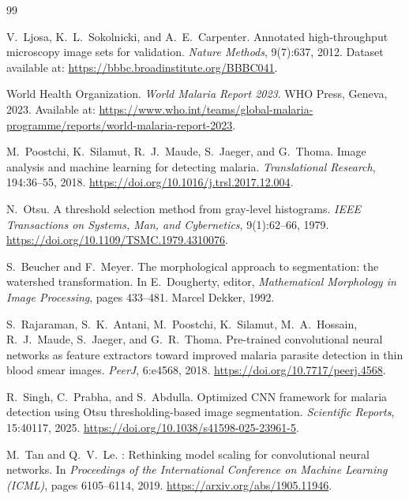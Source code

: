 \documentclass[10pt,twocolumn]{article}
\begin{document}
\begin{thebibliography}{99}

V.~Ljosa, K.~L.~Sokolnicki, and A.~E.~Carpenter.
\newblock Annotated high-throughput microscopy image sets for validation.
\newblock \textit{Nature Methods}, 9(7):637, 2012.
\newblock Dataset available at: \url{https://bbbc.broadinstitute.org/BBBC041}.

World Health Organization.
\newblock \textit{World Malaria Report 2023}.
\newblock WHO Press, Geneva, 2023.
\newblock Available at: \url{https://www.who.int/teams/global-malaria-programme/reports/world-malaria-report-2023}.

M.~Poostchi, K.~Silamut, R.~J.~Maude, S.~Jaeger, and G.~Thoma.
\newblock Image analysis and machine learning for detecting malaria.
\newblock \textit{Translational Research}, 194:36--55, 2018.
\newblock \url{https://doi.org/10.1016/j.trsl.2017.12.004}.

N.~Otsu.
\newblock A threshold selection method from gray-level histograms.
\newblock \textit{IEEE Transactions on Systems, Man, and Cybernetics},
  9(1):62--66, 1979.
\newblock \url{https://doi.org/10.1109/TSMC.1979.4310076}.

S.~Beucher and F.~Meyer.
\newblock The morphological approach to segmentation: the watershed
  transformation.
\newblock In E.~Dougherty, editor, \textit{Mathematical Morphology in Image
  Processing}, pages 433--481. Marcel Dekker, 1992.

S.~Rajaraman, S.~K.~Antani, M.~Poostchi, K.~Silamut, M.~A.~Hossain,
  R.~J.~Maude, S.~Jaeger, and G.~R.~Thoma.
\newblock Pre-trained convolutional neural networks as feature extractors
  toward improved malaria parasite detection in thin blood smear images.
\newblock \textit{PeerJ}, 6:e4568, 2018.
\newblock \url{https://doi.org/10.7717/peerj.4568}.

R.~Singh, C.~Prabha, and S.~Abdulla.
\newblock Optimized {CNN} framework for malaria detection using
  {Otsu} thresholding-based image segmentation.
\newblock \textit{Scientific Reports}, 15:40117, 2025.
\newblock \url{https://doi.org/10.1038/s41598-025-23961-5}.

M.~Tan and Q.~V.~Le.
: Rethinking model scaling for convolutional neural
  networks.
\newblock In \textit{Proceedings of the International Conference on Machine
  Learning (ICML)}, pages 6105--6114, 2019.
\newblock \url{https://arxiv.org/abs/1905.11946}.


\end{thebibliography}
\end{document}
